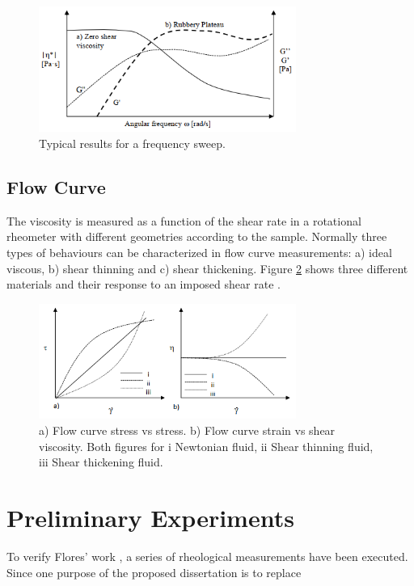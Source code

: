 \begin{figure}[th]
\centering
\includegraphics[width=0.75\textwidth]{./Figures/freqSweep.png}
\decoRule
\caption[Frequency Sweep]{Typical results for a frequency sweep. \cite{Flores2017}}
\label{fig:freqSweep}
\end{figure}

\subsection{Flow Curve}
The viscosity is measured as a function of the shear rate in a rotational rheometer with different geometries according to the sample. Normally three types of behaviours can be characterized in flow curve measurements: a) ideal viscous, b) shear thinning and c) shear thickening. Figure \ref{fig:flowCurve} shows three different materials and their response to an imposed shear rate \cite{Flores2017}.

\begin{figure}[th]
\centering
\includegraphics[width=0.75\textwidth]{./Figures/flowCurve.png}
\decoRule
\caption[Flow Curves]{a) Flow curve stress vs stress. b) Flow curve strain vs shear viscosity. Both figures for i Newtonian fluid, ii Shear thinning fluid, iii Shear thickening fluid. \cite{Flores2017}}
\label{fig:flowCurve}
\end{figure}

\section{Preliminary Experiments}


To verify Flores' work \cite{Flores2017}, a series of rheological measurements have been executed. Since one purpose of the proposed dissertation is to replace






